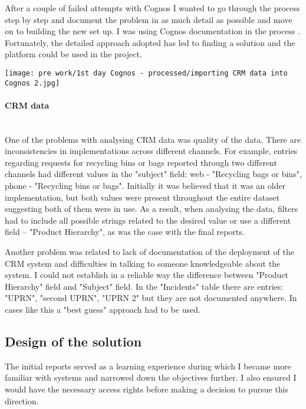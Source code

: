 After a couple of failed attempts with Cognos I wanted to go through the process step by step and document the problem in as much detail as possible and move on to building the new set up. I was using Cognos documentation in the process \citep{IBM2015, IBM2015c}. Fortunately, the detailed approach adopted has led to finding a solution and the platform could be used in the project.

\begin{center}
  \texttt{[image: pre work/1st day Cognos - processed/importing CRM data into Cognos 2.jpg]}
\end{center}
	
				\paragraph{CRM data}\mbox{}\\
One of the problems with analysing CRM data was quality of the data. There are inconsistencies in implementations across different channels. For example, entries regarding requests for recycling bins or bags reported through two different channels had different values in the "subject" field: web - "Recycling bags or bins", phone - "Recycling bins or bags". Initially it was believed that it was an older implementation, but both values were present throughout the entire dataset suggesting both of them were in use. As a result, when analysing the data, filters had to include all possible strings related to the desired value or use a different field – "Product Hierarchy", as was the case with the final reports.

Another problem was related to lack of documentation of the deployment of the CRM system and difficulties in talking to someone knowledgeable about the system. I could not establish in a reliable way the difference between "Product Hierarchy" field and "Subject" field. In the "Incidents" table there are entries: "UPRN", "second UPRN", "UPRN 2" but they are not documented anywhere. In cases like this a "best guess" approach had to be used. 
				
		\subsection{Design of the solution}
		
The initial reports served as a learning experience during which I became more familiar with systems and narrowed down the objectives further. I also ensured I would have the necessary access rights before making a decision to pursue this direction.

